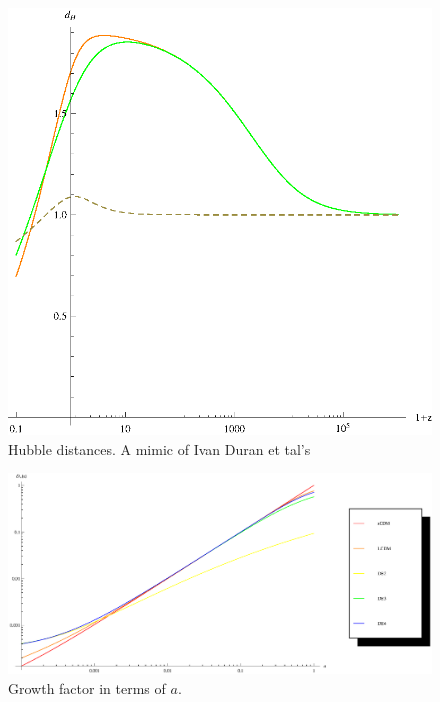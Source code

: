 \documentclass{article}
\begin{document}
\begin{figure}[!htbp]
\centering
\includegraphics[width=400pt]{DEs_Sync-HubbleDistances.eps}
\caption{Hubble distances. A mimic of Ivan Duran et tal's}\label{fig:HubbleDisntances}
\end{figure}




\begin{figure}[!htbp]
\centering
\includegraphics[width=400pt]{DEs_Sync-GrowthFactor-a.eps}
\caption{Growth factor in terms of $a$.}\label{fig:Growth-a}
\end{figure}
\end{document}
